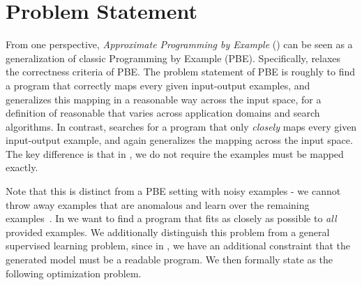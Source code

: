 
\section{Problem Statement}
From one perspective, \textit{Approximate Programming by Example} (\approximatePBE) can be seen as a generalization of classic Programming by Example (PBE).
Specifically, \approximatePBE relaxes the correctness criteria of PBE.
The problem statement of PBE is roughly to find a program that correctly maps every given input-output examples, and generalizes this mapping in a reasonable way across the input space, for a definition of reasonable that varies across application domains and search algorithms.
In contrast, \approximatePBE searches for a program that only \textit{closely} maps every given input-output example, and again generalizes the mapping across the input space.
The key difference is that in \approximatePBE, we do not require the examples must be mapped exactly.

Note that this is distinct from a PBE setting with noisy examples - we cannot throw away examples that are anomalous and learn over the remaining examples~\cite{raychev2016learning}.
In \approximatePBE we want to find a program that fits as closely as possible to \textit{all} provided examples.
We additionally distinguish this problem from a general supervised learning problem, since in \approximatePBE, we have an additional constraint that the generated model must be a readable program.
We then formally state \approximatePBE as the following optimization problem.

